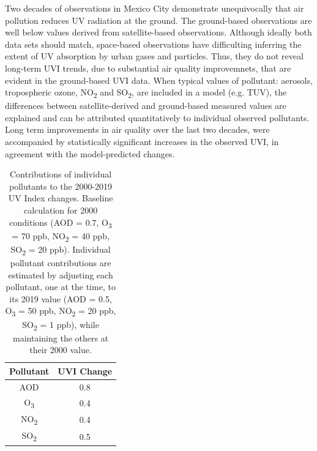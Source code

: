 \documentclass[journal=jacsat,manuscript=article]{achemso}
\begin{document}
Two decades of observations in Mexico City demonstrate unequivocally
that air pollution reduces UV radiation at the ground. The ground-based
observations are well below values derived from satellite-based
observations. Although ideally both data sets should match,
space-based observations have difficulting inferring the extent of UV absorption by urban gases and particles.
Thus, they do not reveal long-term UVI trends, due to substantial air quality improvemnets, that are evident in the ground-based UVI data.
When typical values of pollutant: aerosols,
tropospheric ozone, NO\textsubscript{2}
and SO\textsubscript{2}, are included in a model (e.g. TUV), the
differences between satellite-derived and ground-based measured values
are explained and can be attributed quantitatively to individual
observed pollutants. Long term improvements in air quality over the last two decades,
were accompanied by statistically significant increases in the
observed UVI, in agreement with the model-predicted changes.


\begin{table}[H]
  \centering
  \begin{tabular}{cc}
    \hline
    Pollutant           & UVI Change \\ \hline
    AOD                 & 0.8        \\
    O\textsubscript{3}  & 0.4        \\
    NO\textsubscript{2} & 0.4        \\
    SO\textsubscript{2} & 0.5        \\ \hline
  \end{tabular}
  \caption{Contributions of individual pollutants to the 2000-2019 UV Index changes. Baseline calculation for 2000 conditions (AOD = 0.7, O\textsubscript{3} = 70 ppb, NO\textsubscript{2} = 40 ppb, SO\textsubscript{2} = 20 ppb). Individual pollutant contributions are estimated by adjusting each pollutant, one at the time, to its 2019 value (AOD = 0.5, O\textsubscript{3} = 50 ppb, NO\textsubscript{2} = 20 ppb, SO\textsubscript{2} = 1 ppb), while maintaining the others at their 2000 value.}
  \label{table:year2000-2019}
\end{table}
\end{document}
